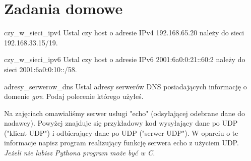 \documentclass{pdfBooklets}
\begin{document}
\section{Zadania domowe}

\begin{Zadanie}{}{czy_w_sieci_ipv4} %
Ustal czy host o adresie IPv4 192.168.65.20 należy do sieci 192.168.33.15/19.
\end{Zadanie}


\begin{Zadanie}{}{czy_w_sieci_ipv6} %
Ustal czy host o adresie IPv6 2001:6a0:0:21::60:2 należy do sieci 2001:6a0:0:10::/58.
\end{Zadanie}


\begin{Zadanie}{}{adresy_serwerow_dns} %
Ustal adresy serwerów DNS posiadających informację o domenie \emph{gov}. Podaj polecenie którego użyłeś.
\end{Zadanie}



\begin{Zadanie}{}{} %
Na zajęciach omawialiśmy serwer usługi "echo" (odsyłającej odebrane dane do nadawcy).
Powyżej znajduje się przykładowy kod wysyłający dane po UDP ("klient UDP") i odbierający dane po UDP ("serwer UDP").
W oparciu o te informacje napisz program realizujący funkcję serwera echo z użyciem UDP.\\
\emph{Jeżeli nie lubisz Pythona program może być w C.}
\end{Zadanie}
\end{document}
